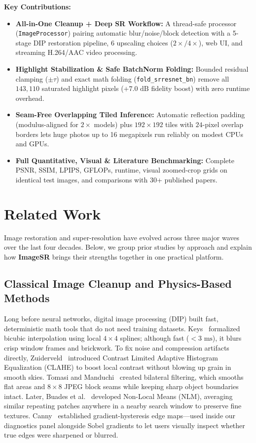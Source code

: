 \documentclass[10pt,onecolumn,journal]{IEEEtran}
\begin{document}
\noindent\textbf{Key Contributions:}
\begin{itemize}
    \item \textbf{All-in-One Cleanup + Deep SR Workflow:} A thread-safe processor (\texttt{ImageProcessor}) pairing automatic blur/noise/block detection with a 5-stage DIP restoration pipeline, 6 upscaling choices ($2\times/4\times$), web UI, and streaming H.264/AAC video processing.
    \item \textbf{Highlight Stabilization \& Safe BatchNorm Folding:} Bounded residual clamping ($\pm\tau$) and exact math folding (\texttt{fold\_srresnet\_bn}) remove all $143{,}110$ saturated highlight pixels ($+7.0\text{ dB}$ fidelity boost) with zero runtime overhead.
    \item \textbf{Seam-Free Overlapping Tiled Inference:} Automatic reflection padding (modulus-aligned for $2\times$ models) plus $192\times192$ tiles with $24$-pixel overlap borders lets huge photos up to 16 megapixels run reliably on modest CPUs and GPUs.
    \item \textbf{Full Quantitative, Visual \& Literature Benchmarking:} Complete PSNR, SSIM, LPIPS, GFLOPs, runtime, visual zoomed-crop grids on identical test images, and comparisons with 30+ published papers.
\end{itemize}

\clearpage
\section{Related Work}

Image restoration and super-resolution have evolved across three major waves over the last four decades. Below, we group prior studies by approach and explain how \textbf{ImageSR} brings their strengths together in one practical platform.

\subsection{Classical Image Cleanup and Physics-Based Methods}
Long before neural networks, digital image processing (DIP) built fast, deterministic math tools that do not need training datasets. Keys~\cite{keys1981cubic} formalized bicubic interpolation using local $4\times4$ splines; although fast ($<3\text{ ms}$), it blurs crisp window frames and brickwork. To fix noise and compression artifacts directly, Zuiderveld~\cite{zuiderveld1994clahe} introduced Contrast Limited Adaptive Histogram Equalization (CLAHE) to boost local contrast without blowing up grain in smooth skies. Tomasi and Manduchi~\cite{tomasi1998bilateral} created bilateral filtering, which smooths flat areas and $8\times8$ JPEG block seams while keeping sharp object boundaries intact. Later, Buades et al.~\cite{buades2005nlm} developed Non-Local Means (NLM), averaging similar repeating patches anywhere in a nearby search window to preserve fine textures. Canny~\cite{canny1986edge} established gradient-hysteresis edge maps---used inside our diagnostics panel alongside Sobel gradients to let users visually inspect whether true edges were sharpened or blurred.
\end{document}
